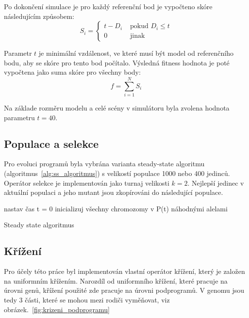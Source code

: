 Po dokončení simulace je pro každý referenční bod je vypočteno skóre následujícím způsobem:
$$S_i=\left\{\begin{matrix}t - D_i&\mbox{ pokud }D_{i}\leq t\\ 0 &\mbox{ jinak }\end{matrix}\right.$$

Parametr $t$ je minimální vzdálenost, ve které musí být model od referenčního bodu, aby se skóre pro tento bod počítalo.
Výsledná fitness hodnota je poté vypočtena jako suma skóre pro všechny body:
$$f=\sum_{i=1}^{N}S_i$$

Na základe rozměru modelu a celé scény v simulátoru byla zvolena hodnota parametru $t = 40$.

\subsection{Populace a selekce}
Pro evoluci programů byla vybrána varianta steady-state algoritmu (algoritmus~\ref{alg:ss_algoritmus}) s velikostí populace 1000 nebo 400 jedinců.
Operátor selekce je implementován jako turnaj velikosti $k = 2$.
Nejlepší jedinec v aktuální populaci a jeho mutant jsou zkopírováni do následující populace.

\begin{algorithm}[H]

    nastav čas t = 0\;
    inicializuj všechny chromozomy v P(t) náhodnými alelami\;

    \caption{Steady state algoritmus}
    \label{alg:ss_algoritmus}
\end{algorithm}

\subsection{Křížení}
Pro účely této práce byl implementován vlastní operátor křížení, který je založen na uniformním křížením.
Narozdíl od uniformního křížení, které pracuje na úrovni genů, křížení použité zde pracuje na úrovni podprogramů.
V genomu jsou tedy 3 části, které se mohou mezi rodiči vyměňovat, viz obrázek.~\ref{fig:krizeni_podprogramu}

